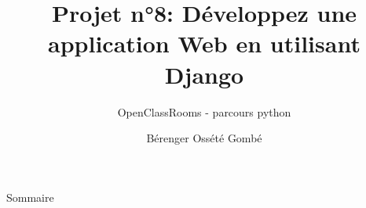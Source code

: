 \documentclass{beamer}
\title{Projet n°8: Développez une application Web en utilisant Django}
\subtitle{OpenClassRooms - parcours python}
\author{Bérenger Ossété Gombé}
\begin{document}
\maketitle

\begin{frame}{Sommaire}
  \tableofcontents
\end{frame}






\end{document}
